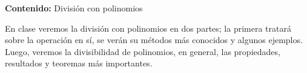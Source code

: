 {\Large\textbf{Contenido:} División con polinomios}

En clase veremos la división con polinomios en dos partes; la primera tratará sobre la operación en sí, se verán su métodos más conocidos y algunos ejemplos.
Luego, veremos la divisibilidad de polinomios, en general, las propiedades, resultados y teoremas más importantes.
